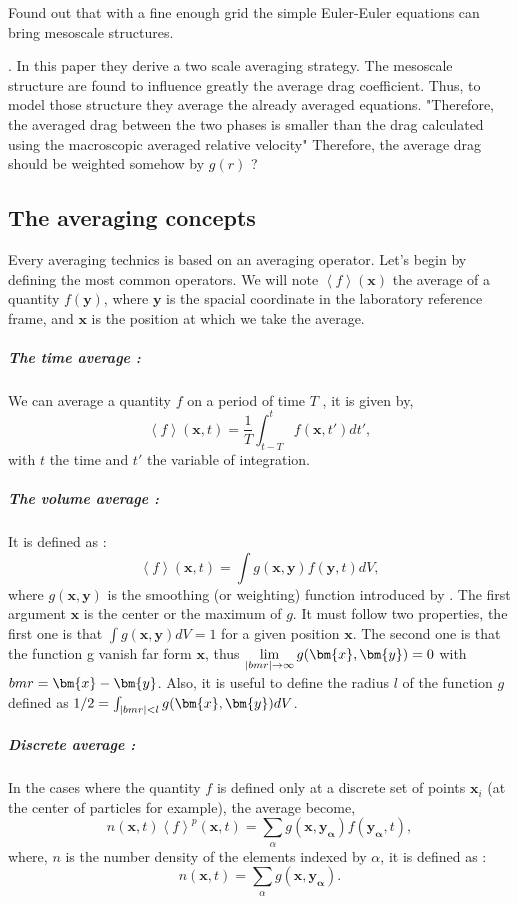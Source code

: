 \citet{zhang2001high} 
Found out that with a fine enough grid the simple Euler-Euler equations can bring mesoscale structures.

\citet{zhang2002effects}.
In this paper they derive a two scale averaging strategy. 
The mesoscale structure are found to influence greatly the average drag coefficient.
Thus, to model those structure they average the already averaged equations. 
"Therefore, the averaged drag between the two phases is smaller
than the drag calculated using the macroscopic averaged relative velocity"
Therefore, the average drag should be weighted somehow by $g(r)$ ?


\subsection{The averaging concepts}
Every averaging technics is based on an averaging operator. 
Let's begin by defining the most common operators. 
We will note $\left<f\right>(\bm{x})$ the average of a quantity $f(\bm{y})$, where $\bm{y}$ is the spacial coordinate in the laboratory reference frame, and $\bm{x}$ is the position at which we take the average.
 
\subparagraph*{The time average :} 
We can average a quantity $f$ on a period of time $T$\citep{morel2015mathematical} \citep{drew1983mathematical}\citet{ishii2010thermo}, it is given by, 
\begin{equation*}
    \left<f\right>(\bm{x},t) = \frac{1}{T}\int_{t-T}^t f(\bm{x},t')dt',
\end{equation*}
with $t$ the time and $t'$ the variable of integration. 
\subparagraph*{The volume average :} 
It is defined as :
\begin{equation}
    \label{eq:vola}
    \left<f\right>(\bm{x},t) = \int g(\bm{x},\bm{y}) f(\bm{y},t)dV,
\end{equation}
where $g(\bm{x},\bm{y})$ is the smoothing (or weighting) function introduced by \citet{jackson1997locally}.
The first argument $\bm{x}$ is the center or the maximum of $g$.
It must follow two properties, the first one is that $\int g(\bm{x},\bm{y}) dV = 1$ for a given position $\bm{x}$.
The second one is that the function g vanish far form $\bm{x}$, thus $\lim\limits_{|\\bm{r}| \to \infty} g(\bm{x},\bm{y}) = 0$ with $\\bm{r} = \bm{x} - \bm{y}$.
Also, it is useful to define the radius $l$ of the function $g$ defined as $1/2 = \int_{|\\bm{r}|<l} g(\bm{x},\bm{y})dV$.
\subparagraph*{Discrete average :}
In the cases where the quantity $f$ is defined only at a discrete set of points $\bm{x}_i$ (at the center of particles for example), the average become, 
\begin{equation}
    \label{eq:partia}
    n(\bm{x},t)\left<f\right>^p(\bm{x},t) = \sum_{\alpha} g(\bm{x},\bm{y_\alpha}) f(\bm{y_\alpha},t),
\end{equation}
where, $n$ is the number density of the elements indexed by $\alpha$, it is defined as : 
\begin{equation}
    n(\bm{x},t) = \sum_{\alpha} g(\bm{x},\bm{y_\alpha}).
\end{equation}

